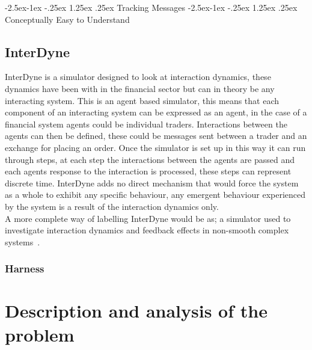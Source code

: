 \documentclass{article}
\makeatletter
\renewcommand\paragraph{\@startsection{paragraph}{4}{\z@}%
	{-2.5ex\@plus -1ex \@minus -.25ex}%
	{1.25ex \@plus .25ex}%
	{\normalfont\normalsize\bfseries}}
\makeatother
\begin{document}
\paragraph{Tracking Messages} 
\paragraph{Conceptually Easy to Understand} 

\subsection{InterDyne} 

InterDyne is a simulator designed to look at interaction dynamics, these dynamics have been with in the financial sector but can in theory be any interacting system. 
This is an agent based simulator, this means that each component of an interacting system can be expressed as an agent, in the case of a financial system agents could be individual traders. Interactions between the agents can then be defined, these could be messages sent between a trader and an exchange for placing an order. 
Once the simulator is set up in this way it can run through steps, at each step the interactions between the agents are passed and each agents response to the interaction is processed, these steps can represent discrete time.   
InterDyne adds no direct mechanism that would force the system as a whole to exhibit any specific behaviour, any emergent behaviour experienced by the system is a result of the interaction dynamics only.\\ 
A more complete way of labelling InterDyne would be as; a simulator used to investigate interaction dynamics and feedback effects in non-smooth complex systems~\cite{Chris_webPage}.

\subsubsection{Harness} 

\section {Description and analysis of the problem} %
\end{document}
